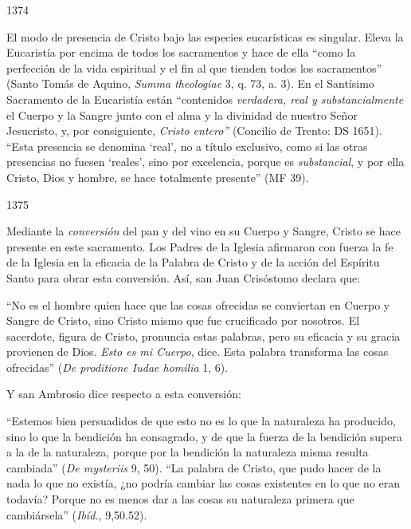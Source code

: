 			\begin{ccebody}\begin{ccenumber}1374\end{ccenumber} El modo de presencia de Cristo bajo las especies eucarísticas es singular. Eleva la Eucaristía por encima de todos los sacramentos y hace de ella “como la perfección de la vida espiritual y el fin al que tienden todos los sacramentos” (Santo Tomás de Aquino, \textit{Summa theologiae} 3, q. 73, a. 3). En el Santísimo Sacramento de la Eucaristía están “contenidos \textit{verdadera, real y substancialmente} el Cuerpo y la Sangre junto con el alma y la divinidad de nuestro Señor Jesucristo, y, por consiguiente, \textit{Cristo entero”} (Concilio de Trento: DS 1651). “Esta presencia se denomina ‘real’, no a título exclusivo, como si las otras presencias no fuesen ‘reales’, sino por excelencia, porque es \textit{substancial}, y por ella Cristo, Dios y hombre, se hace totalmente presente” (MF 39).\end{ccebody}
			
			\begin{ccebody}\begin{ccenumber}1375\end{ccenumber} Mediante la \textit{conversión} del pan y del vino en su Cuerpo y Sangre, Cristo se hace presente en este sacramento. Los Padres de la Iglesia afirmaron con fuerza la fe de la Iglesia en la eficacia de la Palabra de Cristo y de la acción del Espíritu Santo para obrar esta conversión. Así, san Juan Crisóstomo declara que:\end{ccebody}
			
			\begin{ccecite}“No es el hombre quien hace que las cosas ofrecidas se conviertan en Cuerpo y Sangre de Cristo, sino Cristo mismo que fue crucificado por nosotros. El sacerdote, figura de Cristo, pronuncia estas palabras, pero su eficacia y su gracia provienen de Dios. \textit{Esto es mi Cuerpo}, dice. Esta palabra transforma las cosas ofrecidas” (\textit{De proditione Iudae homilia} 1, 6).\end{ccecite}
			
			\begin{ccebody}Y san Ambrosio dice respecto a esta conversión:\end{ccebody}
			
			\begin{ccecite}“Estemos bien persuadidos de que esto no es lo que la naturaleza ha producido, sino lo que la bendición ha consagrado, y de que la fuerza de la bendición supera a la de la naturaleza, porque por la bendición la naturaleza misma resulta cambiada” (\textit{De mysteriis} 9, 50). “La palabra de Cristo, que pudo hacer de la nada lo que no existía, ¿no podría cambiar las cosas existentes en lo que no eran todavía? Porque no es menos dar a las cosas su naturaleza primera que cambiársela” (\textit{Ibíd.}, 9,50.52).\end{ccecite}
			
